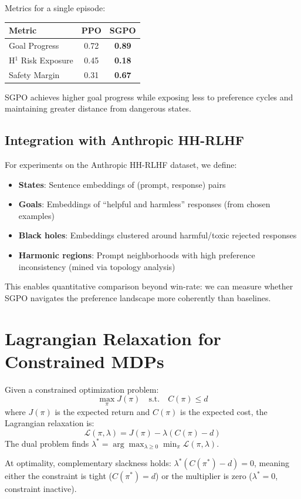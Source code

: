 Metrics for a single episode:
\begin{center}
\begin{tabular}{lcc}
\toprule
\textbf{Metric} & \textbf{PPO} & \textbf{SGPO} \\
\midrule
Goal Progress & 0.72 & \textbf{0.89} \\
H$^1$ Risk Exposure & 0.45 & \textbf{0.18} \\
Safety Margin & 0.31 & \textbf{0.67} \\
\bottomrule
\end{tabular}
\end{center}

SGPO achieves higher goal progress while exposing less to preference cycles and maintaining greater distance from dangerous states.

\subsection{Integration with Anthropic HH-RLHF}

For experiments on the Anthropic HH-RLHF dataset, we define:
\begin{itemize}
    \item \textbf{States}: Sentence embeddings of (prompt, response) pairs
    \item \textbf{Goals}: Embeddings of ``helpful and harmless'' responses (from chosen examples)
    \item \textbf{Black holes}: Embeddings clustered around harmful/toxic rejected responses
    \item \textbf{Harmonic regions}: Prompt neighborhoods with high preference inconsistency (mined via topology analysis)
\end{itemize}

This enables quantitative comparison beyond win-rate: we can measure whether SGPO navigates the preference landscape more coherently than baselines.

\section{Lagrangian Relaxation for Constrained MDPs}
\label{app:lagrangian}

\begin{definition}
Given a constrained optimization problem:
\begin{equation}
\max_\pi J(\pi) \quad \text{s.t.} \quad C(\pi) \leq d
\end{equation}
where $J(\pi)$ is the expected return and $C(\pi)$ is the expected cost, the Lagrangian relaxation is:
\begin{equation}
\mathcal{L}(\pi, \lambda) = J(\pi) - \lambda (C(\pi) - d)
\end{equation}
The dual problem finds $\lambda^* = \arg\max_{\lambda \geq 0} \min_\pi \mathcal{L}(\pi, \lambda)$.

At optimality, complementary slackness holds: $\lambda^* (C(\pi^*) - d) = 0$, meaning either the constraint is tight ($C(\pi^*) = d$) or the multiplier is zero ($\lambda^* = 0$, constraint inactive).
\end{definition}

